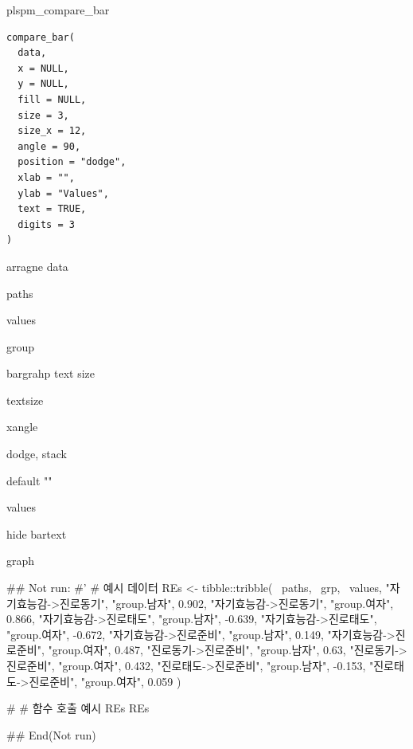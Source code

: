 \documentclass[a4paper]{book}
\begin{document}
%
\begin{Description}
plspm\_compare\_bar
\end{Description}
%
\begin{Usage}
\begin{verbatim}
compare_bar(
  data,
  x = NULL,
  y = NULL,
  fill = NULL,
  size = 3,
  size_x = 12,
  angle = 90,
  position = "dodge",
  xlab = "",
  ylab = "Values",
  text = TRUE,
  digits = 3
)
\end{verbatim}
\end{Usage}
%
\begin{Arguments}
\begin{ldescription}
\item[\code{data}] arragne data

\item[\code{x}] paths

\item[\code{y}] values

\item[\code{fill}] group

\item[\code{size}] bargrahp text size

\item[\code{size\_x}] textsize

\item[\code{angle}] xangle

\item[\code{position}] dodge, stack

\item[\code{xlab}] default ""

\item[\code{ylab}] values

\item[\code{text}] hide bartext
\end{ldescription}
\end{Arguments}
%
\begin{Value}
graph
\end{Value}
%
\begin{Examples}
\begin{ExampleCode}

\#\# Not run: 
#'
# 예시 데이터
REs <- tibble::tribble(
  ~paths, ~grp, ~values,
  "자기효능감->진로동기", "group.남자", 0.902,
  "자기효능감->진로동기", "group.여자", 0.866,
  "자기효능감->진로태도", "group.남자", -0.639,
  "자기효능감->진로태도", "group.여자", -0.672,
  "자기효능감->진로준비", "group.남자", 0.149,
  "자기효능감->진로준비", "group.여자", 0.487,
  "진로동기->진로준비", "group.남자", 0.63,
  "진로동기->진로준비", "group.여자", 0.432,
  "진로태도->진로준비", "group.남자", -0.153,
  "진로태도->진로준비", "group.여자", 0.059
)

# # 함수 호출 예시
REs %
REs %





## End(Not run)
\end{ExampleCode}
\end{Examples}
\end{document}
